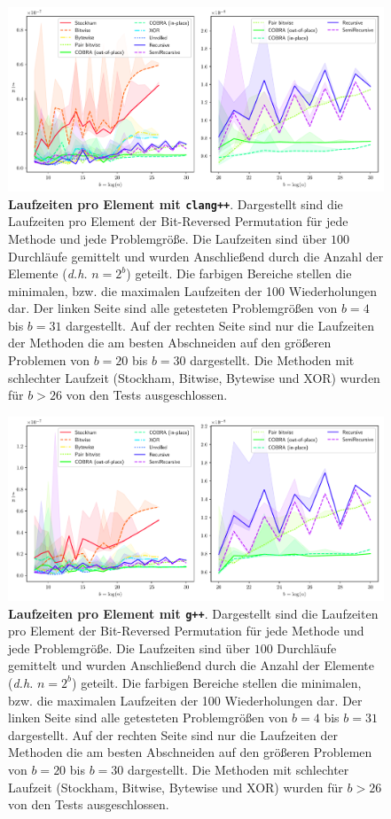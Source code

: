 \documentclass[10pt]{article}
\begin{document}
\begin{figure}[ht!]
\centering
  \includegraphics[width=6in]{results/clang++_run_times.pdf}
\caption{{\bf Laufzeiten pro Element mit {\tt clang++}}. 
    Dargestellt sind die Laufzeiten pro Element der Bit-Reversed Permutation für 
    jede Methode und jede Problemgröße. Die Laufzeiten sind über $100$ Durchläufe gemittelt
    und wurden Anschließend durch die Anzahl der Elemente (\emph{d.h.} $n=2^b$) geteilt.
    Die farbigen Bereiche stellen die minimalen, bzw. die maximalen Laufzeiten der 100 Wiederholungen dar.
    Der linken Seite sind alle getesteten Problemgrößen von $b=4$ bis $b=31$ dargestellt. Auf der 
    rechten Seite sind nur die Laufzeiten der Methoden die am besten Abschneiden auf den größeren Problemen von
    $b=20$ bis $b=30$ dargestellt. Die Methoden mit schlechter Laufzeit (Stockham, Bitwise, Bytewise und XOR) wurden
    für $b>26$ von den Tests ausgeschlossen.
  \label{fig:clang++_runtimes}	
}
\end{figure}

\begin{figure}[ht!]
\centering
  \includegraphics[width=6in]{results/g++_run_times.pdf}
\caption{{\bf Laufzeiten pro Element mit {\tt g++}}. 
    Dargestellt sind die Laufzeiten pro Element der Bit-Reversed Permutation für 
    jede Methode und jede Problemgröße. Die Laufzeiten sind über $100$ Durchläufe gemittelt
    und wurden Anschließend durch die Anzahl der Elemente (\emph{d.h.} $n=2^b$) geteilt.
    Die farbigen Bereiche stellen die minimalen, bzw. die maximalen Laufzeiten der 100 Wiederholungen dar.
    Der linken Seite sind alle getesteten Problemgrößen von $b=4$ bis $b=31$ dargestellt. Auf der 
    rechten Seite sind nur die Laufzeiten der Methoden die am besten Abschneiden auf den größeren Problemen von
    $b=20$ bis $b=30$ dargestellt. Die Methoden mit schlechter Laufzeit (Stockham, Bitwise, Bytewise und XOR) wurden
    für $b>26$ von den Tests ausgeschlossen.
  \label{fig:g++_runtimes}	
}
\end{figure}
\end{document}
